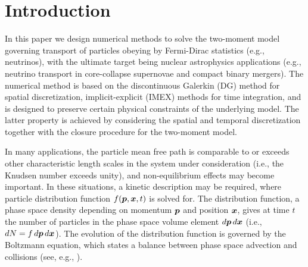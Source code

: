 \section{Introduction}
\label{sec:intro}

In this paper we design numerical methods to solve the two-moment model governing transport of particles obeying by Fermi-Dirac statistics (e.g., neutrinos), with the ultimate target being nuclear astrophysics applications (e.g., neutrino transport in core-collapse supernovae and compact binary mergers).  
The numerical method is based on the discontinuous Galerkin (DG) method for spatial discretization, implicit-explicit (IMEX) methods for time integration, and is designed to preserve certain physical constraints of the underlying model.  
The latter property is achieved by considering the spatial and temporal discretization together with the closure procedure for the two-moment model.  

In many applications, the particle mean free path is comparable to or exceeds other characteristic length scales in the system under consideration (i.e., the Knudsen number exceeds unity), and non-equilibrium effects may become important.  
In these situations, a kinetic description may be required, where particle distribution function $f(\boldsymbol{p},\boldsymbol{x},t)$ is solved for.  
The distribution function, a phase space density depending on momentum $\boldsymbol{p}$ and position $\boldsymbol{x}$, gives at time $t$ the number of particles in the phase space volume element $d\boldsymbol{p}\,d\boldsymbol{x}$ (i.e., $dN=f\,d\boldsymbol{p}\,d\boldsymbol{x}$).  
The evolution of the distribution function is governed by the Boltzmann equation, which states a balance between phase space advection and collisions (see, e.g., \cite{braginskii_1965,chapmanCowling_1970,lifshitzPitaevskii_1981}).  

